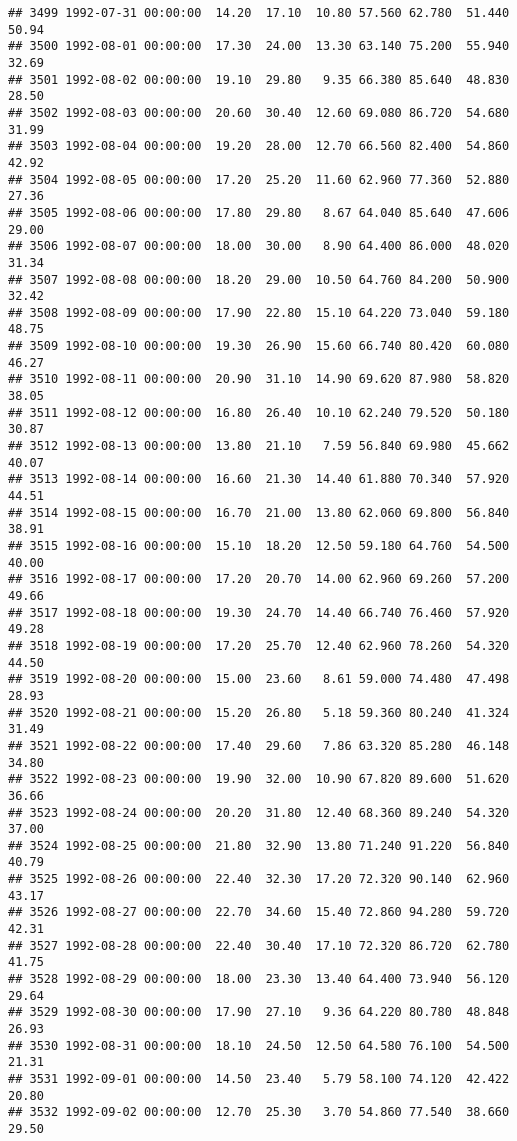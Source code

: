 \documentclass{article}\usepackage{graphicx, color}
\makeatletter
\newenvironment{kframe}{%
 \def\at@end@of@kframe{}%
 \ifinner\ifhmode%
  \def\at@end@of@kframe{\end{minipage}}%
  \begin{minipage}{\columnwidth}%
 \fi\fi%
 \def\FrameCommand##1{\hskip\@totalleftmargin \hskip-\fboxsep
 \colorbox{shadecolor}{##1}\hskip-\fboxsep
     \hskip-\linewidth \hskip-\@totalleftmargin \hskip\columnwidth}%
 \MakeFramed {\advance\hsize-\width
   \@totalleftmargin\z@ \linewidth\hsize
   \@setminipage}}%
 {\par\unskip\endMakeFramed%
 \at@end@of@kframe}
\newenvironment{knitrout}{}{} %
\makeatother
\begin{document}
\begin{knitrout}
\begin{kframe}
\begin{verbatim}
## 3499 1992-07-31 00:00:00  14.20  17.10  10.80 57.560 62.780  51.440  50.94
## 3500 1992-08-01 00:00:00  17.30  24.00  13.30 63.140 75.200  55.940  32.69
## 3501 1992-08-02 00:00:00  19.10  29.80   9.35 66.380 85.640  48.830  28.50
## 3502 1992-08-03 00:00:00  20.60  30.40  12.60 69.080 86.720  54.680  31.99
## 3503 1992-08-04 00:00:00  19.20  28.00  12.70 66.560 82.400  54.860  42.92
## 3504 1992-08-05 00:00:00  17.20  25.20  11.60 62.960 77.360  52.880  27.36
## 3505 1992-08-06 00:00:00  17.80  29.80   8.67 64.040 85.640  47.606  29.00
## 3506 1992-08-07 00:00:00  18.00  30.00   8.90 64.400 86.000  48.020  31.34
## 3507 1992-08-08 00:00:00  18.20  29.00  10.50 64.760 84.200  50.900  32.42
## 3508 1992-08-09 00:00:00  17.90  22.80  15.10 64.220 73.040  59.180  48.75
## 3509 1992-08-10 00:00:00  19.30  26.90  15.60 66.740 80.420  60.080  46.27
## 3510 1992-08-11 00:00:00  20.90  31.10  14.90 69.620 87.980  58.820  38.05
## 3511 1992-08-12 00:00:00  16.80  26.40  10.10 62.240 79.520  50.180  30.87
## 3512 1992-08-13 00:00:00  13.80  21.10   7.59 56.840 69.980  45.662  40.07
## 3513 1992-08-14 00:00:00  16.60  21.30  14.40 61.880 70.340  57.920  44.51
## 3514 1992-08-15 00:00:00  16.70  21.00  13.80 62.060 69.800  56.840  38.91
## 3515 1992-08-16 00:00:00  15.10  18.20  12.50 59.180 64.760  54.500  40.00
## 3516 1992-08-17 00:00:00  17.20  20.70  14.00 62.960 69.260  57.200  49.66
## 3517 1992-08-18 00:00:00  19.30  24.70  14.40 66.740 76.460  57.920  49.28
## 3518 1992-08-19 00:00:00  17.20  25.70  12.40 62.960 78.260  54.320  44.50
## 3519 1992-08-20 00:00:00  15.00  23.60   8.61 59.000 74.480  47.498  28.93
## 3520 1992-08-21 00:00:00  15.20  26.80   5.18 59.360 80.240  41.324  31.49
## 3521 1992-08-22 00:00:00  17.40  29.60   7.86 63.320 85.280  46.148  34.80
## 3522 1992-08-23 00:00:00  19.90  32.00  10.90 67.820 89.600  51.620  36.66
## 3523 1992-08-24 00:00:00  20.20  31.80  12.40 68.360 89.240  54.320  37.00
## 3524 1992-08-25 00:00:00  21.80  32.90  13.80 71.240 91.220  56.840  40.79
## 3525 1992-08-26 00:00:00  22.40  32.30  17.20 72.320 90.140  62.960  43.17
## 3526 1992-08-27 00:00:00  22.70  34.60  15.40 72.860 94.280  59.720  42.31
## 3527 1992-08-28 00:00:00  22.40  30.40  17.10 72.320 86.720  62.780  41.75
## 3528 1992-08-29 00:00:00  18.00  23.30  13.40 64.400 73.940  56.120  29.64
## 3529 1992-08-30 00:00:00  17.90  27.10   9.36 64.220 80.780  48.848  26.93
## 3530 1992-08-31 00:00:00  18.10  24.50  12.50 64.580 76.100  54.500  21.31
## 3531 1992-09-01 00:00:00  14.50  23.40   5.79 58.100 74.120  42.422  20.80
## 3532 1992-09-02 00:00:00  12.70  25.30   3.70 54.860 77.540  38.660  29.50

\end{verbatim}
\end{kframe}
\end{knitrout}
\end{document}
